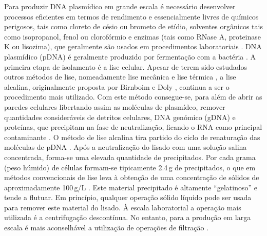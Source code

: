 Para produzir DNA plasmídico em grande escala é necessário desenvolver processos eficientes em termos de rendimento e essencialmente livres de químicos perigosos, tais como cloreto de césio ou brometo de etídio, solventes orgânicos tais como isopropanol, fenol ou clorofórmio e enzimas (tais como RNase A, proteinase K ou lisozima), que geralmente são usados em procedimentos laboratoriais \cite{prather,sousahplc,smrekar,duvaltff,sousabab,kahn,lander}.
%
%
%
%
%
%
%
%
%
%
DNA plasmídico (pDNA) é geralmente produzido por fermentação com a bactéria \ecoli.
%
A primeira etapa de isolamento é a lise celular. Apesar de terem sido estudados outros métodos de lise, nomeadamente lise mecânica \cite{carlson} e lise térmica \cite{holmes,zhu}, a lise alcalina, originalmente proposta por Birnboim e Doly \cite{birnboim}, continua a ser o procedimento mais utilizado.
%
%
%
Com este método consegue-se, para além de abrir as paredes celulares libertando assim as moléculas de plasmídeo, remover quantidades consideráveis de detritos celulares, DNA genómico (gDNA) e proteínas, que precipitam na fase de neutralização, ficando o RNA como principal contaminante \cite{smrekar,chang,theo}.
%
%
%
%
O método de lise alcalina tira partido do ciclo de renaturação das moléculas de pDNA \cite{frerix}.
%
Após a neutralização do lisado com uma solução salina concentrada, forma-se uma elevada quantidade de precipitados. Por cada grama (peso húmido) de células formam-se tipicamente 2.4\,g de precipitados, o que em métodos convencionais de lise leva à obtenção de uma concentração de sólidos de aproximadamente 100\,g/L \cite{theo}.
%
%
Este material precipitado é altamente ``gelatinoso'' e tende a flutuar. Em princípio, qualquer operação sólido líquido pode ser usada para remover este material do lisado.
%
%
À escala laboratorial a operação mais utilizada é a centrifugação descontínua.
%
No entanto, para a produção em larga escala é mais aconselhável a utilização de operações de filtração \cite{prather,theo,chamsart,levy00}. 

